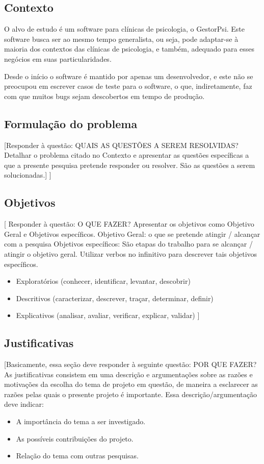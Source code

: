 
\subsection{Contexto} %
\label{sub:contexto}
O alvo de estudo é um software para clínicas de psicologia, o GestorPsi.
Este software busca ser ao mesmo tempo generalista, ou seja,
pode adaptar-se à maioria dos contextos das clínicas de psicologia, e também,
adequado para esses negócios em suas particularidades.

Desde o início o software é mantido por apenas um desenvolvedor,
e este não se preocupou em escrever casos de teste para o software, o que,
indiretamente, faz com que muitos bugs sejam descobertos em tempo de produção.

\subsection{Formulação do problema} %
\label{sub:formula_o_do_problema}

[Responder à questão: QUAIS AS QUESTÕES A SEREM RESOLVIDAS?
Detalhar o problema citado no Contexto e apresentar as questões específicas a que a presente pesquisa pretende responder ou resolver. São as questões a serem solucionadas.]
]

\subsection{Objetivos} %
\label{sub:objetivos}

[ Responder à questão: O QUE FAZER?
Apresentar os objetivos como Objetivo Geral e Objetivos específicos.
Objetivo Geral: o que se pretende atingir / alcançar com a pesquisa
Objetivos específicos: São etapas do trabalho para se alcançar / atingir o objetivo geral. Utilizar verbos no infinitivo para descrever tais objetivos específicos.
\begin{itemize}
	\item Exploratórios (conhecer, identificar, levantar, descobrir)
	\item Descritivos (caracterizar, descrever, traçar, determinar, definir)
	\item Explicativos (analisar, avaliar, verificar, explicar, validar)   ]
\end{itemize}


\subsection{Justificativas} %
\label{sub:justificativas}

[Basicamente, essa seção deve responder à seguinte questão: POR QUE FAZER?
As justificativas consistem em uma descrição e argumentações sobre as razões e motivações da escolha do tema de projeto em questão, de maneira a esclarecer as razões pelas quais o presente projeto é importante.
Essa descrição/argumentação deve indicar:
\begin{itemize}
	\item A importância do tema a ser investigado.
	\item As possíveis contribuições do projeto.
	\item Relação do tema com outras pesquisas.
\end{itemize}

